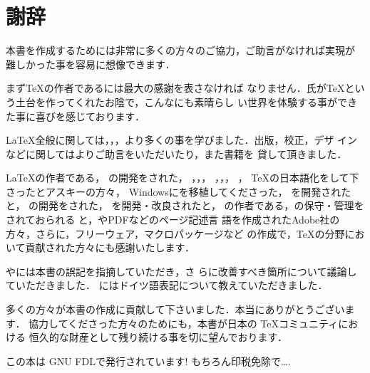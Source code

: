 \chapter{謝辞}

本書を作成するためには非常に多くの方々のご協力，ご助言がなければ実現が
難しかった事を容易に想像できます．

まず{\TeX}の作者であるには最大の感謝を表さなければ
なりません．氏が\TeX という土台を作ってくれたお陰で，こんなにも素晴らし
い世界を体験する事ができた事に喜びを感じております．%

{\LaTeX}全般に関しては，，，より多くの事を学びました．出版，校正，デザ
インなどに関してはよりご助言をいただいたり，また書籍を
貸して頂きました．

{\LaTeX}の作者である，
{\LaTeXe}の開発をされた，
，，，
，，，
，
{\TeX}の日本語化をして下さったとアスキーの方々，
Windowsに{\pTeX}を移植してくださった，
\Dviout を開発されたと，
\prog{\BibTeX}の開発をされた，
を開発・改良されたと，
\Dvipdfm の作者である，{\Dvipdfmx}の保守・管理をされておられる
と，{\PS}やPDFなどのページ記述言
語を作成されたAdobe社の方々，さらに，フリーウェア，マクロパッケージなど
の作成で，{\TeX}の分野において貢献された方々にも感謝いたします．

やには本書の誤記を指摘していただき，さ
らに改善すべき箇所について議論していただきました．
にはドイツ語表記について教えていただきました．

多くの方々が本書の作成に貢献して下さいました．本当にありがとうございます．
協力してくださった方々のためにも，本書が日本の \TeX コミュニティにおける
恒久的な財産として残り続ける事を切に望んでおります．

\clearpage
\thispagestyle{empty}
\null\vfill

\centerline{\headfont 
  この本は GNU FDLで発行されています! もちろん印税免除で\ldots.}

